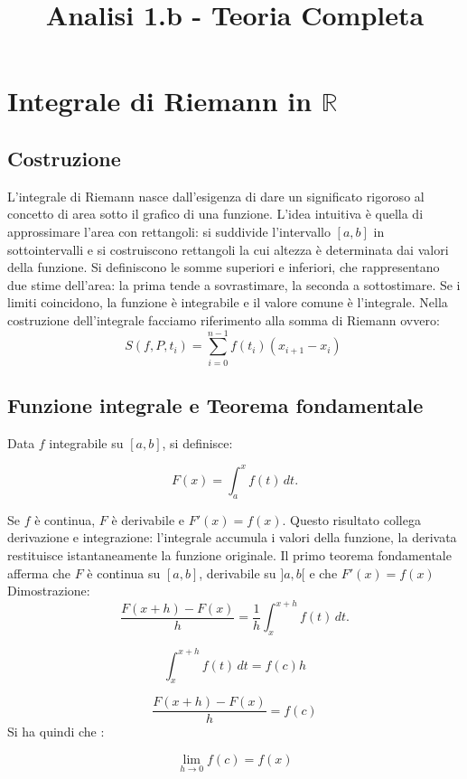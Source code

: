 \documentclass[a4paper,12pt]{article}
\title{Analisi 1.b - Teoria Completa}
\date{}
\begin{document}
\maketitle
\vspace{-2.5cm}
\renewcommand{\contentsname}{Indice}
\tableofcontents

\section{Integrale di Riemann in $\mathbb{R}$}

\subsection{Costruzione}
L'integrale di Riemann nasce dall'esigenza di dare un significato rigoroso al concetto di area sotto il grafico di una funzione.  
L’idea intuitiva è quella di approssimare l’area con rettangoli: si suddivide l'intervallo $[a,b]$ in sottointervalli e si costruiscono rettangoli la cui altezza è determinata dai valori della funzione.  
Si definiscono le somme superiori e inferiori, che rappresentano due stime dell’area: la prima tende a sovrastimare, la seconda a sottostimare.  
Se i limiti coincidono, la funzione è integrabile e il valore comune è l’integrale.
Nella costruzione dell'integrale facciamo riferimento alla somma di Riemann ovvero:
\[
S(f, P, {t_i}) = \sum_{i=0}^{n-1} f(t_i) (x_{i+1} - x_i)\
\]

\subsection{Funzione integrale e Teorema fondamentale}
Data $f$ integrabile su $[a,b]$, si definisce:


\[
F(x)=\int_a^x f(t)\,dt.
\]


Se $f$ è continua, $F$ è derivabile e $F'(x)=f(x)$.  
Questo risultato collega derivazione e integrazione: l’integrale accumula i valori della funzione, la derivata restituisce istantaneamente la funzione originale. 
Il primo teorema fondamentale afferma che $F$ è continua su $[a,b]$, derivabile su $]a,b[$ e che $F'(x) = f(x)$
Dimostrazione:
\[
\frac{F(x+h)-F(x)}{h} = \frac{1}{h}\int_x^{x+h}f(t) \,dt.
\]

\[\int_x^{x+h} f(t)\,dt = f(c)h\]


\[\frac{F(x+h)-F(x)}{h} = f(c)\]
Si ha quindi che :

\[\lim_{h \to 0} f(c) = f(x)\]
\end{document}
